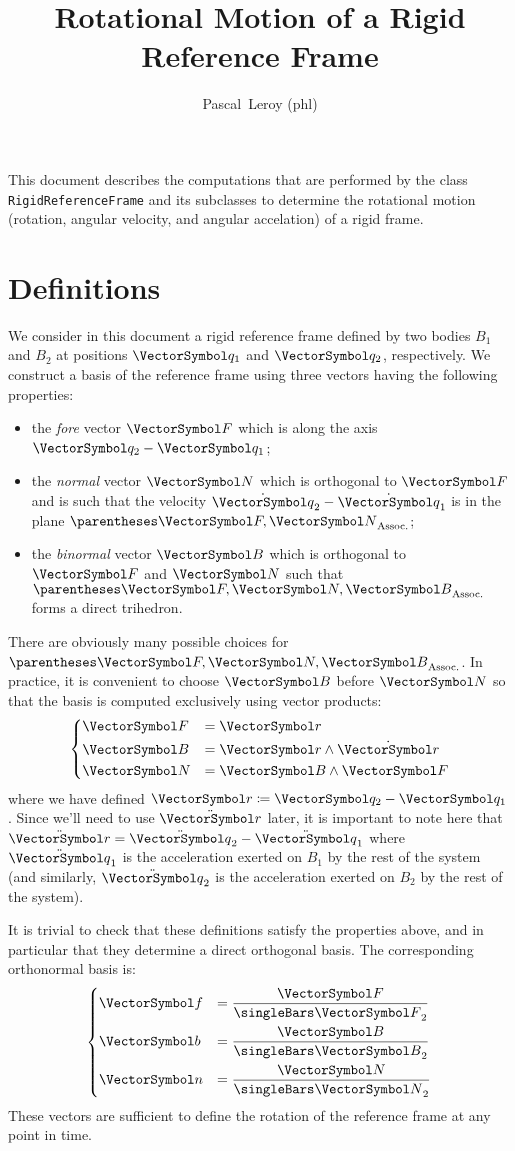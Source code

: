 \documentclass[10pt, a4paper, twoside]{basestyle}
\title{Rotational Motion of a Rigid Reference Frame}
\date{\printdate{2023-04-26}}
\author{Pascal~Leroy (phl)}
\begin{document}
\maketitle
\begin{sloppypar}
\noindent
This document describes the computations that are performed by the class \texttt{RigidReferenceFrame} and its subclasses to determine the rotational motion (rotation,
angular velocity, and angular accelation) of a rigid frame.
\end{sloppypar}

\section*{Definitions}
We consider in this document a rigid reference frame defined by two bodies $B_1$ and $B_2$ at positions $\vq_1$ and $\vq_2$, respectively.  We construct a basis of the reference frame using three vectors having the following properties:
\begin{itemize}
\item{the \emph{fore} vector $\vF$ which is along the axis $\vq_2 - \vq_1$;}
\item{the \emph{normal} vector $\vN$ which is orthogonal to $\vF$ and is such that the velocity $\dot{\vq}_2 - \dot{\vq}_1$ is in the plane $\pa{\vF, \vN}$;}
\item{the \emph{binormal} vector $\vB$ which is orthogonal to $\vF$ and $\vN$ such that $\pa{\vF, \vN, \vB}$ forms a direct trihedron.}
\end{itemize}
There are obviously many possible choices for $\pa{\vF, \vN, \vB}$.  In practice, it is convenient to choose $\vB$ before $\vN$ so that the basis is computed exclusively using vector products:
\begin{equation}
\begin{dcases}
\vF &= \vr \\
\vB &= \vr \wedge \dot{\vr} \\
\vN &= \vB \wedge \vF
\end{dcases}
\label{eqnFBN}
\end{equation}
where we have defined $\vr \DefineAs \vq_2 - \vq_1$.  Since we'll need to use $\ddot{\vr}$ later, it is important to note here that $\ddot{\vr} = \ddot{\vq}_2 - \ddot{\vq}_1$ where $\ddot{\vq}_1$ is the acceleration exerted on $B_1$ by the rest of the system (and similarly, $\ddot{\vq}_2$ is the acceleration exerted on $B_2$ by the rest of the system).

It is trivial to check that these definitions satisfy the properties above, and in particular that they determine a direct orthogonal basis.  The corresponding orthonormal basis is:
\begin{equation}
\begin{dcases}
\vf &= \frac{\vF}{\norm\vF} \\
\vb &= \frac{\vB}{\norm\vB} \\
\vn &= \frac{\vN}{\norm\vN}
\end{dcases}
\label{eqnfbn}
\end{equation}
These vectors are sufficient to define the rotation of the reference frame at any point in time.
\end{document}
